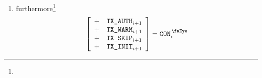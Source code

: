 \begin{enumerate}
\begin{enumerate}
\[\begin{array}{lcl}
                                        \end{array} \right]
                                        = 1
                                \]
                        \item furthermore\footnote{}
                                \[
                                        \left[ \begin{array}{lcl}
                                                + & \txAuth _{i + 1} \\
                                                + & \txWarm _{i + 1} \\
                                                + & \txSkip _{i + 1} \\
                                                + & \txInit _{i + 1} \\
                                        \end{array} \right]
                                        = \peekContext _{i}
                                \]
                \end{enumerate}
\end{enumerate}
